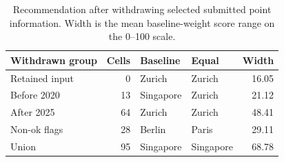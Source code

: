 \begin{table}[!ht]\centering
\caption{Recommendation after withdrawing selected submitted point information. Width is the mean baseline-weight score range on the 0--100 scale.}\label{tab:vintage}
\begin{tabular}{l r l l r}\toprule
Withdrawn group & Cells & Baseline & Equal & Width\\\midrule
Retained input & 0 & Zurich & Zurich & 16.05 \\
Before 2020 & 13 & Singapore & Zurich & 21.12 \\
After 2025 & 64 & Zurich & Zurich & 48.41 \\
Non-ok flags & 28 & Berlin & Paris & 29.11 \\
Union & 95 & Singapore & Singapore & 68.78 \\
\bottomrule\end{tabular}\end{table}
